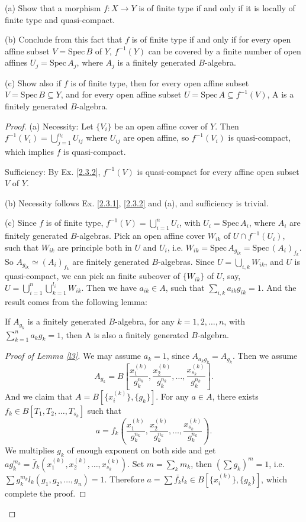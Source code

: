 \begin{exe}
	\label{2.3.3}
	(a) Show that a morphism $f:X\rightarrow Y$ is of finite type if and only if it is locally of finite type and quasi-compact.
	
	(b) Conclude from this fact that $f$ is of finite type if and only if for every open affine subset $V=\mathrm{Spec}\,B$ of $Y$, $f^{-1}(Y)$ can be covered
	by a finite number of open affines $U_j=\mathrm{Spec}\,A_j$, where $A_j$ is a finitely generated $B$-algebra.
	
	(c) Show also if $f$ is of finite type, then for every open affine subset $V=\mathrm{Spec}\,B\subseteq Y$, and for every open affine
	subset $U=\mathrm{Spec}\,A\subseteq f^{-1}(V)$, A is a finitely generated $B$-algebra.
\end{exe}
\begin{proof}
	(a) Necessity: Let $\{V_i\}$ be an open affine cover of $Y$. Then $f^{-1}(V_i)=\bigcup_{j=1}^{n_i}U_{ij}$ where $U_{ij}$ are open affine, so $f^{-1}(V_i)$ is quasi-compact, which implies $f$ is quasi-compact.
	
	Sufficiency: By Ex. \ref{2.3.2}, $f^{-1}(V)$ is quasi-compact for every affine open subset $V$ of $Y$.
	
	(b) Necessity follows Ex. \ref{2.3.1}, \ref{2.3.2} and (a), and sufficiency is trivial.
	
	(c) Since $f$ is of finite type, $f^{-1}(V)=\bigcup_{i=1}^nU_i$, with $U_i=\mathrm{Spec}\,A_i$, where $A_i$ are finitely generated $B$-algebras. Pick an open affine cover $W_{ik}$ of $U\cap f^{-1}(U_i)$, such that 
	$W_{ik}$ are principle both in $U$ and $U_i$, i.e. $W_{ik}=\mathrm{Spec}\,A_{g_{ik}}=\mathrm{Spec}\,(A_{i})_{f_{k}}$. So $A_{g_{ik}}\simeq (A_{i})_{f_k}$ are finitely generated $B$-algebras. Since $U=\bigcup_{i,k} W_{ik}$, and
	$U$ is quasi-compact, we can pick an finite subcover of $\{W_{ik}\}$ of $U$, say, $U=\bigcup_{i=1}^n\bigcup_{k=1}^{l_i}W_{ik}$. Then we have $a_{ik}\in A$, such that $\sum_{i,k} a_{ik}g_{ik}=1$.
	And the result comes from the following lemma:
	\begin{lm}
		\label{l3}
		If $A_{g_k}$ is a finitely generated $B$-algebra, for any $k=1,2,\dots,n$, with $\sum_{k=1}^n a_kg_k=1$, then A is also a finitely generated $B$-algebra.
	\end{lm}
	\begin{proof}[Proof of Lemma \ref*{l3}]
		We may assume $a_k=1$, since $A_{a_kg_k}=A_{g_k}$. Then we assume $$A_{g_k}=B\left[\frac{x_1^{(k)}}{g_k^{n_k}},\frac{x_2^{(k)}}{g_k^{n_k}},\dots,\frac{x_{s_k}^{(k)}}{g_k^{n_k}}\right].$$
		And we claim that $A=B[\{x_i^{(k)}\},\{g_k\}]$. For any $a\in A$, there exists $f_k\in B[T_1,T_2,\dots,T_{s_k}]$ such that $$a=f_k\left(\frac{x_1^{(k)}}{g_k^{n_k}},\frac{x_2^{(k)}}{g_k^{n_k}},\dots,\frac{x_{s_k}^{(k)}}{g_k^{n_k}}\right).$$
		We multiplies $g_k$ of enough exponent on both side and get $ag_k^{m_k}=\bar {f}_k(x_1^{(k)},x_2^{(k)},\dots,x_{s_k}^{(k)})$. Set $m=\sum_k m_k$, then $ (\sum g_k)^m=1$, i.e. $\sum g_k^{m_k}l_k(g_1,g_2,\dots,g_n)=1$.
		Therefore $a=\sum \bar{f_k}l_k\in B[\{x_i^{(k)}\},\{g_k\}]$, which complete the proof.
	\end{proof}
\end{proof}

